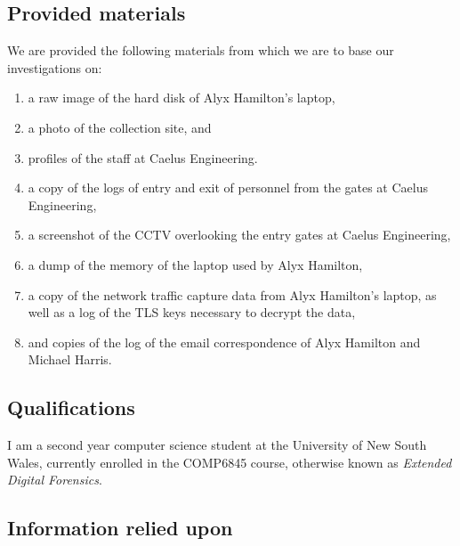 
\subsection{Provided materials} %
\begin{myenum}
     \item We are provided the following materials from which we are to base our investigations on:
         \begin{enumerate}
            \item a raw image of the hard disk of Alyx Hamilton's laptop,
            \item a photo of the collection site, and 
            \item profiles of the staff at Caelus Engineering.
            \item a copy of the logs of entry and exit of personnel from the gates at Caelus Engineering,
            \item a screenshot of the CCTV overlooking the entry gates at Caelus Engineering,
            \item a dump of the memory of the laptop used by Alyx Hamilton,
            \item a copy of the network traffic capture data from Alyx Hamilton's laptop, as well as a log of the TLS keys necessary to decrypt the data,
            \item and copies of the log of the email correspondence of Alyx Hamilton and Michael Harris.
         \end{enumerate}
\end{myenum}
\label{sub:provided_materials}


\subsection{Qualifications} %
\begin{myenum}
     \item I am a second year computer science student at the University of New South Wales, currently enrolled in the COMP6845 course, otherwise known as \emph{Extended Digital Forensics}.
\end{myenum}
\label{sub:qualifications}


\subsection{Information relied upon} %
\label{sub:information_relied_upon}


